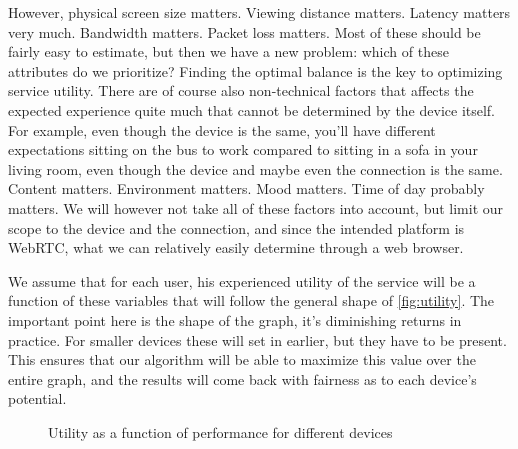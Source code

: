 However, physical screen size matters. Viewing distance matters. Latency matters very much. Bandwidth matters. Packet loss matters. Most of these should be fairly easy to estimate, but then we have a new problem: which of these attributes do we prioritize? Finding the optimal balance is the key to optimizing service utility. There are of course also non-technical factors that affects the expected experience quite much that cannot be determined by the device itself. For example, even though the device is the same, you'll have different expectations sitting on the bus to work compared to sitting in a sofa in your living room, even though the device and maybe even the connection is the same. Content matters. Environment matters. Mood matters. Time of day probably matters. We will however not take all of these factors into account, but limit our scope to the device and the connection, and since the intended platform is WebRTC, what we can relatively easily determine through a web browser.

We assume that for each user, his experienced utility of the service will be a function of these variables that will follow the general shape of \autoref{fig:utility}. The important point here is the shape of the graph, it's diminishing returns in practice. For smaller devices these will set in earlier, but they have to be present. This ensures that our algorithm will be able to maximize this value over the entire graph, and the results will come back with fairness as to each device's potential.

\begin{figure}
    \centering
    \caption{Utility as a function of performance for different devices}
    \label{fig:utility}
\end{figure}


